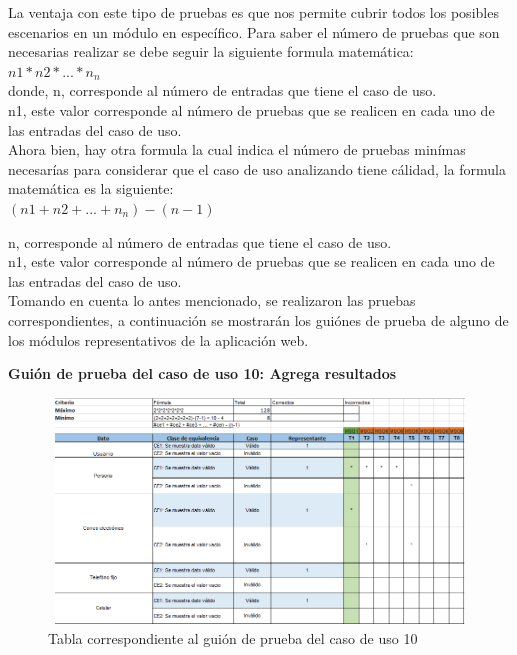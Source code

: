 	\noindent La ventaja con este tipo de pruebas es que nos permite cubrir todos los posibles escenarios en un módulo en específico. Para saber el número de pruebas que son necesarias realizar se debe seguir la siguiente formula matemática:\\
	$ n1 * n2 * ... * n_{n} $ \\
	donde, 
	n, corresponde al número de entradas que tiene el caso de uso.\\
	n1, este valor corresponde al número de pruebas que se realicen en cada uno de las entradas del caso de uso.\\
	
	\noindent Ahora bien, hay otra formula la cual indica el número de pruebas minímas necesarías para considerar que el caso de uso analizando tiene cálidad, la formula matemática es la siguiente: \\
	
	$ (n1 + n2 + ... + n_{n}) - (n - 1) $
	
	n, corresponde al número de entradas que tiene el caso de uso.\\
	n1, este valor corresponde al número de pruebas que se realicen en cada uno de las entradas del caso de uso.\\
	
	\noindent Tomando en cuenta lo antes mencionado, se realizaron las pruebas correspondientes, a continuación se mostrarán los guiónes de prueba de alguno de los módulos representativos de la aplicación web.\\
	\pagebreak
	
	\textbf{Guión de prueba del caso de uso 10: Agrega resultados}
	
	\begin{figure}[hbt!]
		\centering
		\includegraphics[width=14cm, height=6cm]{Imagenes/Pruebas/GuionPruebaCU10}
		\caption{Tabla correspondiente al guión de prueba del caso de uso 10}
		\label{guionpruebaCU10}
	\end{figure}

